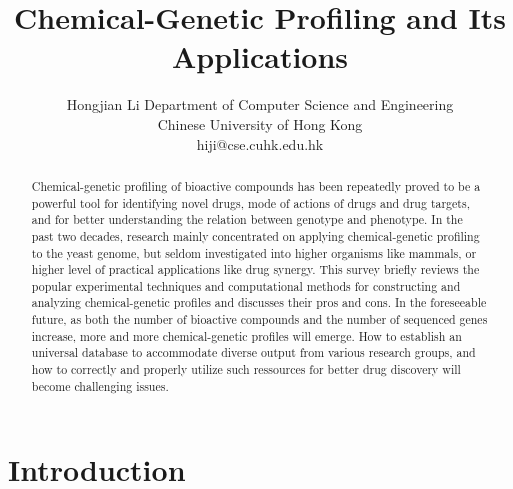 \documentclass[12pt,conference,compsocconf]{../IEEEtran}
\begin{document}
\makeatletter
\g@addto@macro\maketitle{\thispagestyle{plain}}
\def\@oddfoot{\hfil \thepage \hfil}
\makeatother

\title{Chemical-Genetic Profiling and Its Applications}
\author
{
\IEEEauthorblockN
{
Hongjian Li
\IEEEauthorblockA
{
Department of Computer Science and Engineering\\
Chinese University of Hong Kong\\
hiji@cse.cuhk.edu.hk
}
}
}
\maketitle

\begin{abstract}

Chemical-genetic profiling of bioactive compounds has been repeatedly proved to be a powerful tool for identifying novel drugs, mode of actions of drugs and drug targets, and for better understanding the relation between genotype and phenotype. In the past two decades, research mainly concentrated on applying chemical-genetic profiling to the yeast genome, but seldom investigated into higher organisms like mammals, or higher level of practical applications like drug synergy. This survey briefly reviews the popular experimental techniques and computational methods for constructing and analyzing chemical-genetic profiles and discusses their pros and cons. In the foreseeable future, as both the number of bioactive compounds and the number of sequenced genes increase, more and more chemical-genetic profiles will emerge. How to establish an universal database to accommodate diverse output from various research groups, and how to correctly and properly utilize such ressources for better drug discovery will become challenging issues.

\end{abstract}




\section{Introduction}
\end{document}
